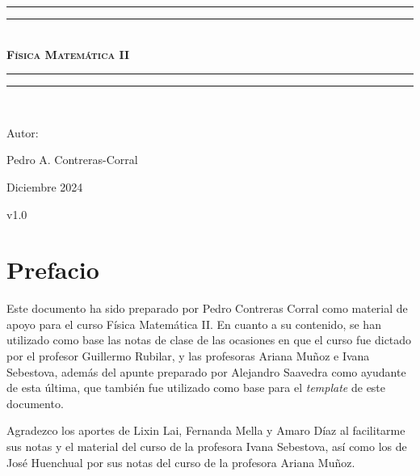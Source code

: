 \documentclass[letterpaper,12pt]{report}
\newlength{\drop}
\theoremstyle{definition}
\begin{document}
\begin{titlepage}
 \textheight
    \centering
    \vspace*{\baselineskip}
    \rule{\textwidth}{1.6pt}\vspace*{-\baselineskip}\vspace*{2pt}
    \rule{\textwidth}{0.4pt}\\[\baselineskip]
    {\scshape\bfseries\Huge{}\selectfont Física Matemática II} \\[0.2\baselineskip]
    \rule{\textwidth}{0.4pt}\vspace*{-\baselineskip}\vspace{3.2pt}
    \rule{\textwidth}{1.6pt}\\[\baselineskip]
    {\Large Autor: \par}
{\large Pedro A. Contreras-Corral \par}
\vfill
{\large Diciembre 2024 \par}
{\large v1.0 \par}
\end{titlepage}

\chapter*{Prefacio}

Este documento ha sido preparado por Pedro Contreras Corral como material de apoyo para el curso Física Matemática II. En cuanto a su contenido, se han utilizado como base las notas de clase de las ocasiones en que el curso fue dictado por el profesor Guillermo Rubilar, y las profesoras Ariana Muñoz e Ivana Sebestova, además del apunte preparado por Alejandro Saavedra como ayudante de esta última, que también fue utilizado como base para el \emph{template} de este documento.


Agradezco los aportes de Lixin Lai, Fernanda Mella y Amaro Díaz al facilitarme sus notas y el material del curso de la profesora Ivana Sebestova, así como los de José Huenchual por sus notas del curso de la profesora Ariana Muñoz.

\tableofcontents


% 








% 

\appendix




\nocite{*} %
\printbibliography[title={Referencias}]
\end{document}
